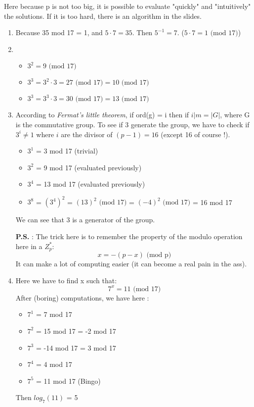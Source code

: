 \begin{solution}
	Here because p is not too big, it is possible to evaluate "quickly" and "intuitively" the solutions. If it is too hard, there is an algorithm in the slides.
	\begin{enumerate}
		\item Because 35 mod 17 = 1, and $5 \cdot 7 = 35$. \newline Then $5^{-1} = 7$.  ($5 \cdot 7 = 1 \text{ (mod 17)}$)
		\item \begin{itemize}
			\item $3^2 = 9 \text{ (mod 17)}$
			\item $3^3 = 3^2 \cdot 3 = 27 \text{ (mod 17)} = 10 \text{ (mod 17)}$
			\item $3^3 = 3^3 \cdot 3 = 30 \text{ (mod 17)} = 13 \text{ (mod 17)}$
		\end{itemize}
		\item According to \textit{Fermat's little theorem}, if ord(g) = i then if $i|m = |G|$, where G is the commutative group. To see if 3 generate the group, we have to check if $3^i \neq 1$ where $i$ are the divisor of $(p-1) = 16$ (except 16 of course !).
		\begin{itemize}
			\item $3^1$ = 3 mod 17 (trivial)
			\item $3^2$ = 9 mod 17 (evaluated previously)
			\item $3^4$ = 13 mod 17 (evaluated previously)
			\item $3^8$ = $(3^4)^2$ = $(13)^2 \text{ (mod 17)}$ = $(-4)^2 \text{ (mod 17)}$ = 16 mod 17
		\end{itemize}
		We can see that 3 is a generator of the group.

		\textbf{P.S.} : The trick here is to remember the property of the modulo operation here in a $Z^*_p$:
		\[ x = -(p - x) \text{ (mod p)} \]
		It can make a lot of computing easier (it can become a real pain in the ass).
		\item Here we have to find x such that:
		\[ 7^x = 11 \text{ (mod 17)} \]
		After (boring) computations, we have here :
		\begin{itemize}
			\item $7^1$ = 7 mod 17
			\item $7^2$ = 15 mod 17 = -2 mod 17
			\item $7^3$ = -14 mod 17 = 3 mod 17
			\item $7^4$ = 4 mod 17
			\item $7^5$ = 11 mod 17 (Bingo)
		\end{itemize}
		Then $log_7(11)$ = 5
	\end{enumerate}
\end{solution}



